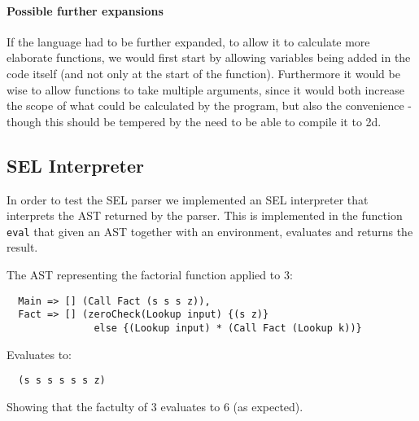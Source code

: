 \paragraph{Possible further expansions}
If the language had to be further expanded, to allow it to calculate
more elaborate functions, we would first start by allowing variables
being added in the code itself (and not only at the start of the
function). Furthermore it would be wise to allow functions to take
multiple arguments, since it would both increase the scope of what
could be calculated by the program, but also the convenience - though
this should be tempered by the need to be able to compile it to
2d.


\subsection{SEL Interpreter}
In order to test the SEL parser we implemented an SEL interpreter
that interprets the AST returned by the parser. This is implemented
in the function \texttt{eval} that given an AST together with an
environment, evaluates and returns the result.

\begin{samepage}
  \begin{exmp}
    The AST representing the factorial function applied to $3$:
\begin{verbatim}
  Main => [] (Call Fact (s s s z)),
  Fact => [] (zeroCheck(Lookup input) {(s z)}
               else {(Lookup input) * (Call Fact (Lookup k))}
\end{verbatim}
    Evaluates to:
\begin{verbatim}
  (s s s s s s z)
\end{verbatim}
    Showing that the factulty of $3$ evaluates to $6$ (as expected).
  \end{exmp}
\end{samepage}


